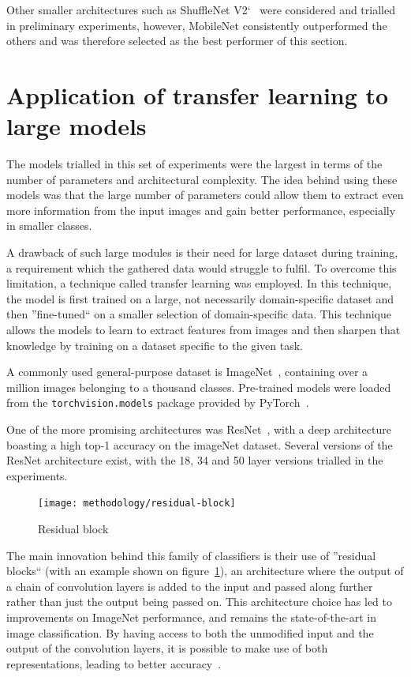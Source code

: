 Other smaller architectures such as ShuffleNet V2`~\cite{shuffleNet} were considered and trialled in preliminary experiments,
however, MobileNet consistently outperformed the others and was therefore selected as the best performer of this section.
\section{Application of transfer learning to large models}
\label{sec:transfer-learning}
The models trialled in this set of experiments were the largest in terms of the number of parameters and
architectural complexity.
The idea behind using these models was that the large number of parameters could allow them to extract even more information
from the input images and gain better performance, especially in smaller classes.

A drawback of such large modules is their need for large dataset during training, a requirement which the gathered data would
struggle to fulfil.
To overcome this limitation, a technique called transfer learning was employed.
In this technique, the model is first trained on a large, not necessarily domain-specific dataset and then
''fine-tuned`` on a smaller selection of domain-specific data.
This technique allows the models to learn to extract features from images and then sharpen that knowledge by training on a dataset
specific to the given task.

A commonly used general-purpose dataset is ImageNet~\cite{imageNet}, containing over a million images belonging to a thousand
classes.
Pre-trained models were loaded from the \verb|torchvision.models| package provided by PyTorch~\cite{pytorchLibrary}.

One of the more promising architectures was ResNet~\cite{resNet}, with a deep architecture boasting a high top-1 accuracy on the imageNet dataset.
Several versions of the ResNet architecture exist, with the 18, 34 and 50 layer versions trialled in the experiments.
\newline
\begin{figure}
    \centering
    \texttt{[image: methodology/residual-block]}
    \caption[Residual block]{Residual block~\cite{resNet}}
    \label{fig:residualBlock}
\end{figure}
The main innovation behind this family of classifiers is their use of ''residual blocks`` (with an example shown on figure~\ref{fig:residualBlock}), an architecture where the output of
a chain of convolution layers is added to the input and passed along further rather than just the output being passed on.
This architecture choice has led to improvements on ImageNet performance, and remains the state-of-the-art in image classification.
By having access to both the unmodified input and the output of the convolution layers, it is possible to make use of both representations,
leading to better accuracy~\cite{resNet}.

